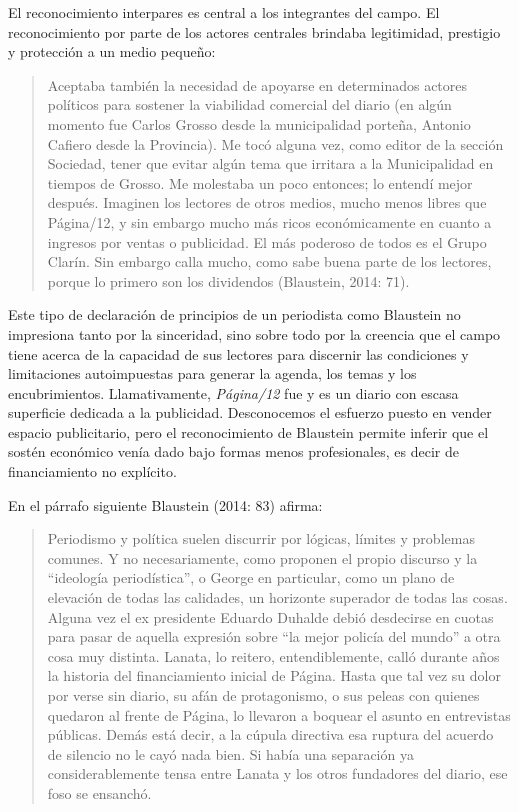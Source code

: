 {El reconocimiento interpares es central a los integrantes del campo. El reconocimiento por parte de los actores centrales brindaba legitimidad, prestigio y protección a un medio pequeño:

\begin{quote}
Aceptaba también la necesidad de apoyarse en determinados actores políticos para sostener la viabilidad comercial del diario (en algún momento fue Carlos Grosso desde la municipalidad porteña, Antonio Cafiero desde la Provincia). Me tocó alguna vez, como editor de la sección Sociedad, tener que evitar algún tema que irritara a la Municipalidad en tiempos de Grosso. Me molestaba un poco entonces; lo entendí mejor después. Imaginen los lectores de otros medios, mucho menos libres que Página/12, y sin embargo mucho más ricos económicamente en cuanto a ingresos por ventas o publicidad. El más poderoso de todos es el Grupo Clarín. Sin embargo calla mucho, como sabe buena parte de los lectores, porque lo primero son los dividendos (Blaustein, 2014: 71).
\end{quote}

Este tipo de declaración de principios de un periodista como Blaustein no impresiona tanto por la sinceridad, sino sobre todo por la creencia que el campo tiene acerca de la capacidad de sus lectores para discernir las condiciones y limitaciones autoimpuestas para generar la agenda, los temas y los encubrimientos. Llamativamente, \emph{Página/12} fue y es un diario con escasa superficie dedicada a la publicidad. Desconocemos el esfuerzo puesto en vender espacio publicitario, pero el reconocimiento de Blaustein permite inferir que el sostén económico venía dado bajo formas menos profesionales, es decir de financiamiento no explícito.

En el párrafo siguiente Blaustein (2014: 83) afirma:

\begin{quote}
Periodismo y política suelen discurrir por lógicas, límites y problemas comunes. Y no necesariamente, como proponen el propio discurso y la ``ideología periodística'', o George en particular, como un plano de elevación de todas las calidades, un horizonte superador de todas las cosas. Alguna vez el ex presidente Eduardo Duhalde debió desdecirse en cuotas para pasar de aquella expresión sobre ``la mejor policía del mundo'' a otra cosa muy distinta. Lanata, lo reitero, entendiblemente, calló durante años la historia del financiamiento inicial de Página. Hasta que tal vez su dolor por verse sin diario, su afán de protagonismo, o sus peleas con quienes quedaron al frente de Página, lo llevaron a boquear el asunto en entrevistas públicas. Demás está decir, a la cúpula directiva esa ruptura del acuerdo de silencio no le cayó nada bien. Si había una separación ya considerablemente tensa entre Lanata y los otros fundadores del diario, ese foso se ensanchó.
\end{quote}

}
